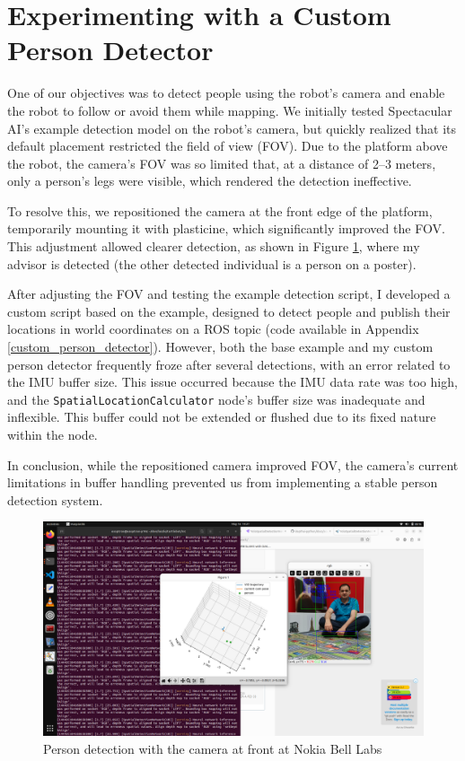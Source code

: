 \section{Experimenting with a Custom Person Detector}

One of our objectives was to detect people using the robot's camera and enable the robot to follow or avoid them while mapping. We initially tested Spectacular AI’s example detection model on the robot’s camera, but quickly realized that its default placement restricted the field of view (FOV). Due to the platform above the robot, the camera’s FOV was so limited that, at a distance of 2–3 meters, only a person’s legs were visible, which rendered the detection ineffective.

To resolve this, we repositioned the camera at the front edge of the platform, temporarily mounting it with plasticine, which significantly improved the FOV. This adjustment allowed clearer detection, as shown in Figure \ref{fig:person_detection_camera_at_front_nokia}, where my advisor is detected (the other detected individual is a person on a poster).

After adjusting the FOV and testing the example detection script, I developed a custom script based on the example, designed to detect people and publish their locations in world coordinates on a ROS topic (code available in Appendix \ref{custom_person_detector}). However, both the base example and my custom person detector frequently froze after several detections, with an error related to the IMU buffer size. This issue occurred because the IMU data rate was too high, and the \verb|SpatialLocationCalculator| node’s buffer size was inadequate and inflexible. This buffer could not be extended or flushed due to its fixed nature within the node.

In conclusion, while the repositioned camera improved FOV, the camera's current limitations in buffer handling prevented us from implementing a stable person detection system.

\begin{figure}[htbp]
    \centering
    \includegraphics[width=150mm, keepaspectratio]{figures/person_detection_camera_at_front_nokia.png}
    \caption{Person detection with the camera at front at Nokia Bell Labs}
    \label{fig:person_detection_camera_at_front_nokia}
\end{figure}

